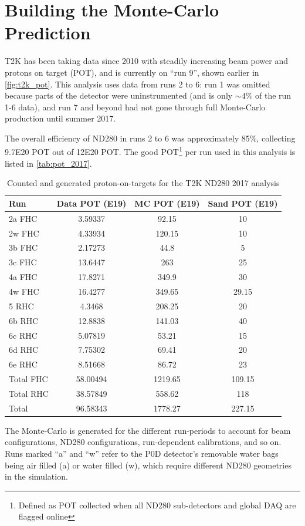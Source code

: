\section{Building the Monte-Carlo Prediction}
T2K has been taking data since 2010 with steadily increasing beam power and protons on target (POT), and is currently on ``run 9'', shown earlier in \autoref{fig:t2k_pot}. This analysis uses data from runs 2 to 6: run 1 was omitted because parts of the detector were uninstrumented (and is only $\sim4\%$ of the run 1-6 data), and run 7 and beyond had not gone through full Monte-Carlo production until summer 2017. 

The overall efficiency of ND280 in runs 2 to 6 was approximately 85\%, collecting 9.7E20 POT out of 12E20 POT. The good POT\footnote{Defined as POT collected when all ND280 sub-detectors and global DAQ are flagged online} per run used in this analysis is listed in \autoref{tab:pot_2017}.

\begin{table}[h]
	\centering
	\begin{tabular}{ l | c c c }
		\hline
		Run & Data POT (E19) & MC POT (E19) & Sand POT (E19) \\
		\hline
		\hline
		2a  FHC & 3.59337    & 92.15       & 10 \\
		2w  FHC & 4.33934    & 120.15      & 10 \\
		\hline
		3b FHC  & 2.17273    & 44.8        & 5 \\
		3c FHC  & 13.6447    & 263         & 25 \\
		\hline
		4a FHC  & 17.8271    & 349.9       & 30 \\
		4w FHC  & 16.4277    & 349.65      & 29.15 \\
		\hline
		5 RHC & 4.3468     & 208.25      & 20 \\
		\hline
		6b RHC & 12.8838    & 141.03      & 40 \\
		6c RHC & 5.07819    & 53.21       & 15 \\
		6d RHC & 7.75302    & 69.41       & 20 \\
		6e RHC & 8.51668    & 86.72       & 23 \\
		\hline
		\hline
		Total FHC & 58.00494 & 1219.65 & 109.15\\
		Total RHC & 38.57849 & 558.62  & 118 \\
		\hline
		Total & 96.58343 & 1778.27 & 227.15 \\
		\hline
	\end{tabular}
	\caption{Counted and generated proton-on-targets for the T2K ND280 2017 analysis}
	\label{tab:pot_2017}
\end{table}
The Monte-Carlo is generated for the different run-periods to account for beam configurations, ND280 configurations, run-dependent calibrations, and so on. Runs marked ``a'' and ``w'' refer to the P0D detector's removable water bags being air filled (a) or water filled (w), which require different ND280 geometries in the simulation.


